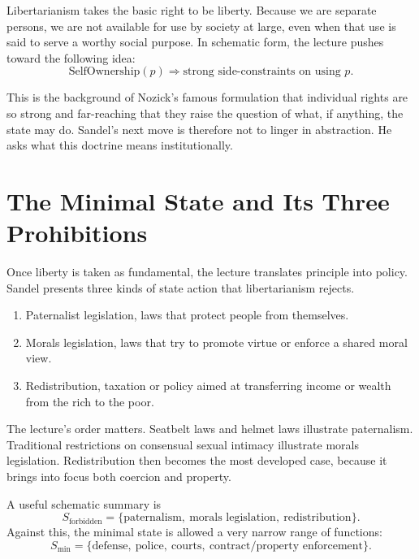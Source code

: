 Libertarianism takes the basic right to be liberty. Because we are separate persons, we are not available for use by society at large, even when that use is said to serve a worthy social purpose. In schematic form, the lecture pushes toward the following idea:
\begin{equation}
\text{SelfOwnership}(p)\Longrightarrow \text{strong side-constraints on using }p.
\end{equation}

This is the background of Nozick's famous formulation that individual rights are so strong and far-reaching that they raise the question of what, if anything, the state may do. Sandel's next move is therefore not to linger in abstraction. He asks what this doctrine means institutionally.

\section{The Minimal State and Its Three Prohibitions}

Once liberty is taken as fundamental, the lecture translates principle into policy. Sandel presents three kinds of state action that libertarianism rejects.

\begin{enumerate}
\item Paternalist legislation, laws that protect people from themselves.
\item Morals legislation, laws that try to promote virtue or enforce a shared moral view.
\item Redistribution, taxation or policy aimed at transferring income or wealth from the rich to the poor.
\end{enumerate}

The lecture's order matters. Seatbelt laws and helmet laws illustrate paternalism. Traditional restrictions on consensual sexual intimacy illustrate morals legislation. Redistribution then becomes the most developed case, because it brings into focus both coercion and property.

A useful schematic summary is
\begin{equation}
S_{\mathrm{forbidden}}=\{\text{paternalism},\ \text{morals legislation},\ \text{redistribution}\}.
\end{equation}
Against this, the minimal state is allowed a very narrow range of functions:
\begin{equation}
S_{\min}=\{\text{defense},\ \text{police},\ \text{courts},\ \text{contract/property enforcement}\}.
\end{equation}

